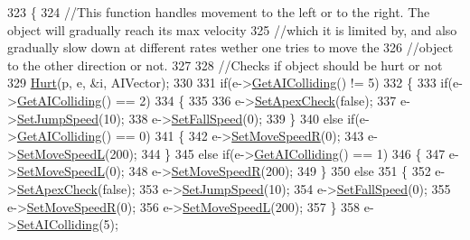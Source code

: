 \begin{DoxyCode}
323                                                                                                            
                             \{
324     \textcolor{comment}{//This function handles movement to the left or to the right. The object will gradually reach its max
       velocity}
325     \textcolor{comment}{//which it is limited by, and also gradually slow down at different rates wether one tries to move the}
326     \textcolor{comment}{//object to the other direction or not.}
327 
328     \textcolor{comment}{//Checks if object should be hurt or not}
329     \hyperlink{classPhysics_a7375c001f23111ea2291f8175c92f10d}{Hurt}(p, e, &i, AIVector);
330 
331     \textcolor{keywordflow}{if}(e->\hyperlink{classAI_a0757c03ecae2e2f3145ad1fc1eab2f03}{GetAIColliding}() != 5)
332     \{
333         \textcolor{keywordflow}{if}(e->\hyperlink{classAI_a0757c03ecae2e2f3145ad1fc1eab2f03}{GetAIColliding}() == 2)
334         \{
335 
336             e->\hyperlink{classAI_acb9cc6624a01a27516f68406429f7496}{SetApexCheck}(\textcolor{keyword}{false});
337             e->\hyperlink{classAI_a90247314e34a1d0e1376a27dac61f1c4}{SetJumpSpeed}(10);
338             e->\hyperlink{classAI_ab42bf8c5b4ec0d54423b55e2db524640}{SetFallSpeed}(0);
339         \}
340         \textcolor{keywordflow}{else} \textcolor{keywordflow}{if}(e->\hyperlink{classAI_a0757c03ecae2e2f3145ad1fc1eab2f03}{GetAIColliding}() == 0)
341         \{
342             e->\hyperlink{classAI_a171141e877f08757696a65e3d9305660}{SetMoveSpeedR}(0);
343             e->\hyperlink{classAI_a7e52788a6f93f78feaa0c8867f454888}{SetMoveSpeedL}(200);
344         \}
345         \textcolor{keywordflow}{else} \textcolor{keywordflow}{if}(e->\hyperlink{classAI_a0757c03ecae2e2f3145ad1fc1eab2f03}{GetAIColliding}() == 1)
346         \{
347             e->\hyperlink{classAI_a7e52788a6f93f78feaa0c8867f454888}{SetMoveSpeedL}(0);
348             e->\hyperlink{classAI_a171141e877f08757696a65e3d9305660}{SetMoveSpeedR}(200);
349         \}
350         \textcolor{keywordflow}{else}
351         \{
352             e->\hyperlink{classAI_acb9cc6624a01a27516f68406429f7496}{SetApexCheck}(\textcolor{keyword}{false});
353             e->\hyperlink{classAI_a90247314e34a1d0e1376a27dac61f1c4}{SetJumpSpeed}(10);
354             e->\hyperlink{classAI_ab42bf8c5b4ec0d54423b55e2db524640}{SetFallSpeed}(0);
355             e->\hyperlink{classAI_a171141e877f08757696a65e3d9305660}{SetMoveSpeedR}(0);
356             e->\hyperlink{classAI_a7e52788a6f93f78feaa0c8867f454888}{SetMoveSpeedL}(200);
357         \}
358         e->\hyperlink{classAI_a31e4fec3672db036e511ca2c6a5d2b75}{SetAIColliding}(5);

\end{DoxyCode}
